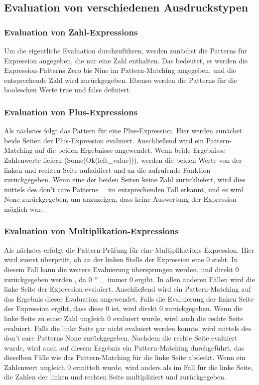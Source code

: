 \documentclass[a4paper, 1ppt]{article}
\begin{document}
\subsection{Evaluation von verschiedenen Ausdruckstypen}
\subsubsection{Evaluation von Zahl-Expressions}
Um die eigentliche Evaluation durchzuführen, werden zunächst die Patterns für Expression angegeben, die nur eine Zahl enthalten. Das bedeutet, es werden die Expression-Patterns Zero bis Nine im Pattern-Matching angegeben, und die entsprechende Zahl wird zurückgegeben. Ebenso werden die Patterns für die booleschen Werte true und false definiert.
\subsubsection{Evaluation von Plus-Expressions}
Als nächstes folgt das Pattern für eine Plus-Expression. Hier werden zunächst beide Seiten der Plus-Expression evaluiert. Anschließend wird ein Pattern-Matching auf die beiden Ergebnisse angewendet. Wenn beide Ergebnisse Zahlenwerte liefern (Some(Ok(left\_value))), werden die beiden Werte von der linken und rechten Seite aufaddiert und an die aufrufende Funktion zurückgegeben. Wenn eine der beiden Seiten keine Zahl zurückliefert, wird dies mittels des don't care Patterns \_ im entsprechenden Fall erkannt, und es wird None zurückgegeben, um anzuzeigen, dass keine Auswertung der Expression möglich war.
\subsubsection{Evaluation von Multiplikation-Expressions}
Als nächstes erfolgt die Pattern-Prüfung für eine Multiplikations-Expression. Hier wird zuerst überprüft, ob an der linken Stelle der Expression eine 0 steht. In diesem Fall kann die weitere Evaluierung übersprungen werden, und direkt 0 zurückgegeben werden , da 0 * \_ immer 0 ergibt. In allen anderen Fällen wird die linke Seite der Expression evaluiert. Anschließend wird ein Pattern-Matching auf das Ergebnis dieser Evaluation angewendet. Falls die Evaluierung der linken Seite der Expression ergibt, dass diese 0 ist, wird direkt 0 zurückgegeben. Wenn die linke Seite zu einer Zahl ungleich 0 evaluiert wurde, wird auch die rechte Seite evaluiert. Falls die linke Seite gar nicht evaluiert werden konnte, wird mittels des don't care Patterns None zurückgegeben. Nachdem die rechte Seite evaluiert wurde, wird auch auf diesem Ergebnis ein Pattern-Matching durchgeführt, das dieselben Fälle wie das Pattern-Matching für die linke Seite abdeckt. Wenn ein Zahlenwert ungleich 0 ermittelt wurde, wird anders als im Fall für die linke Seite, die Zahlen der linken und rechten Seite multipliziert und zurückgegeben.
\end{document}
